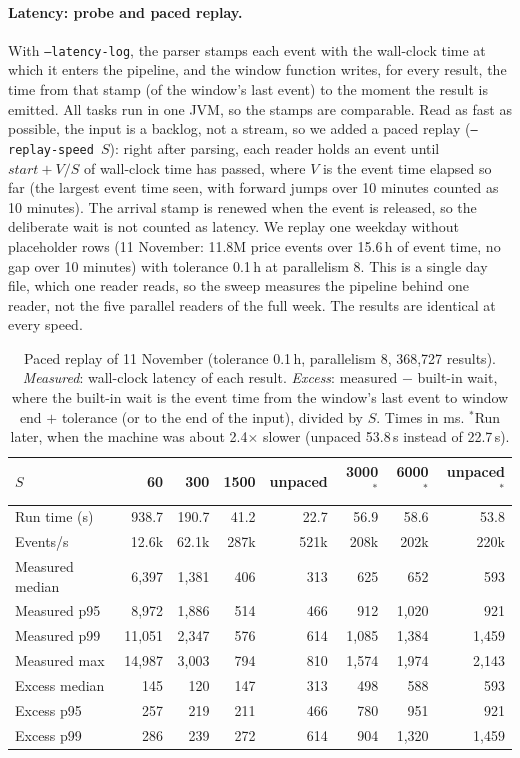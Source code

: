 \documentclass[sigconf,nonacm]{acmart}
\begin{document}
\paragraph{Latency: probe and paced replay.} With \texttt{--latency-log}, the
parser stamps each event with the wall-clock time at which it enters the
pipeline, and the window function writes, for every result, the time from that
stamp (of the window's last event) to the moment the result is emitted. All
tasks run in one JVM, so the stamps are comparable. Read as fast as possible,
the input is a backlog, not a stream, so we added a paced replay
(\texttt{--replay-speed}~$S$): right after parsing, each reader holds an event
until $\textit{start} + V/S$ of wall-clock time has passed, where $V$ is the
event time elapsed so far (the largest event time seen, with forward jumps over
10 minutes counted as 10 minutes). The arrival stamp is renewed when the event
is released, so the deliberate wait is not counted as latency. We replay one
weekday without placeholder rows (11 November: 11.8M price events over
15.6\,h of event time, no gap over 10 minutes) with tolerance 0.1\,h at
parallelism 8. This is a single day file, which one reader reads, so the sweep
measures the pipeline behind one reader, not the five parallel readers of the
full week. The results are identical at every speed.

\begin{table}[t]
\caption{Paced replay of 11 November (tolerance 0.1\,h, parallelism 8,
368,727 results). \emph{Measured}: wall-clock latency of each result.
\emph{Excess}: measured $-$ built-in wait, where the built-in wait is the event
time from the window's last event to window end $+$ tolerance (or to the end
of the input), divided by $S$. Times in ms. $^\ast$Run later, when the
machine was about 2.4$\times$ slower (unpaced 53.8\,s instead of
22.7\,s).}\label{tab:paced}
\small
\begin{tabular}{lrrrrrrr}
\toprule
$S$ & 60 & 300 & 1500 & unpaced & 3000$^\ast$ & 6000$^\ast$ & unpaced$^\ast$ \\
\midrule
Run time (s)     & 938.7 & 190.7 & 41.2 & 22.7 & 56.9 & 58.6 & 53.8 \\
Events/s         & 12.6k & 62.1k & 287k & 521k & 208k & 202k & 220k \\
\midrule
Measured median  & 6,397 & 1,381 & 406 & 313 & 625 & 652 & 593 \\
Measured p95     & 8,972 & 1,886 & 514 & 466 & 912 & 1,020 & 921 \\
Measured p99     & 11,051 & 2,347 & 576 & 614 & 1,085 & 1,384 & 1,459 \\
Measured max     & 14,987 & 3,003 & 794 & 810 & 1,574 & 1,974 & 2,143 \\
\midrule
Excess median    & 145 & 120 & 147 & 313 & 498 & 588 & 593 \\
Excess p95       & 257 & 219 & 211 & 466 & 780 & 951 & 921 \\
Excess p99       & 286 & 239 & 272 & 614 & 904 & 1,320 & 1,459 \\
\bottomrule
\end{tabular}
\end{table}
\end{document}
